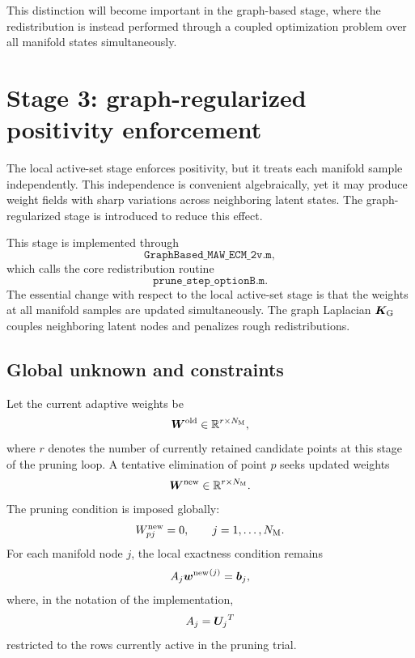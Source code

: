 \documentclass[11pt,a4paper]{article}
\begin{document}
This distinction will become important in the graph-based stage, where the
redistribution is instead performed through a coupled optimization problem over
all manifold states simultaneously.


\section{Stage 3: graph-regularized positivity enforcement}
\label{sec:graph_regularized_stage}

The local active-set stage enforces positivity, but it treats each manifold
sample independently. This independence is convenient algebraically, yet it may
produce weight fields with sharp variations across neighboring latent states.
The graph-regularized stage is introduced to reduce this effect.

This stage is implemented through
\[
        \texttt{GraphBased\_MAW\_ECM\_2v.m},
\]
which calls the core redistribution routine
\[
        \texttt{prune\_step\_optionB.m}.
\]
The essential change with respect to the local active-set stage is that the
weights at all manifold samples are updated simultaneously. The graph Laplacian
$\bm K_{\mathrm{G}}$ couples neighboring latent nodes and penalizes rough redistributions.

\subsection{Global unknown and constraints}

Let the current adaptive weights be
\[
        \bm W^{\mathrm{old}} \in \mathbb{R}^{r\times N_{\mathrm{M}}},
\]
where $r$ denotes the number of currently retained candidate points at this
stage of the pruning loop. A tentative elimination of point $p$ seeks updated
weights
\[
        \bm W^{\mathrm{new}} \in \mathbb{R}^{r\times N_{\mathrm{M}}}.
\]
The pruning condition is imposed globally:
\[
        W^{\mathrm{new}}_{pj}=0,
        \qquad
        j=1,\ldots,N_{\mathrm{M}}.
        \label{eq:graph_pruned_row}
\]
For each manifold node $j$, the local exactness condition remains
\[
        A_j {\bm w^{\mathrm{new}}}^{(j)} = \bm b_j,
        \label{eq:graph_local_exactness}
\]
where, in the notation of the implementation,
\[
        A_j = {\bm U_j}^T
\]
restricted to the rows currently active in the pruning trial.
\end{document}
